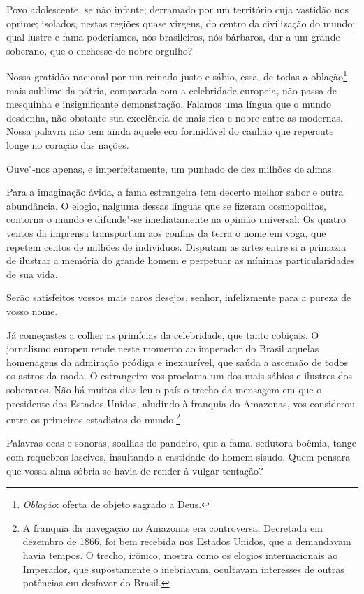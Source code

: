 Povo adolescente, se não infante; derramado por um território cuja
vastidão nos oprime; isolados, nestas regiões quase virgens, do centro
da civilização do mundo; qual lustre e fama poderíamos, nós
brasileiros, nós bárbaros, dar a um grande soberano, que o enchesse de
nobre orgulho? 

Nossa gratidão nacional por um reinado justo e sábio, essa, de todas a
oblação\footnote{ \textit{Oblação}: oferta de objeto sagrado a Deus.}
 mais sublime da pátria, comparada com a celebridade europeia, não passa
de mesquinha e insignificante demonstração. Falamos uma língua que o
mundo desdenha, não obstante sua excelência de mais rica e nobre entre
as modernas. Nossa palavra não tem ainda aquele eco formidável do
canhão que repercute longe no coração das nações.

Ouve"-nos apenas, e imperfeitamente, um punhado de dez milhões de almas.

Para a imaginação ávida, a fama estrangeira tem decerto melhor sabor e
outra abundância. O elogio, nalguma dessas línguas que se fizeram
cosmopolitas, contorna o mundo e difunde"-se imediatamente na opinião
universal. Os quatro ventos da imprensa transportam aos confins da
terra o nome em voga, que repetem centos de milhões de indivíduos.
Disputam as artes entre si a primazia de ilustrar a memória do grande
homem e perpetuar as mínimas particularidades de sua vida.

Serão satisfeitos vossos mais caros desejos, senhor, infelizmente para a
pureza de vosso nome.

Já começastes a colher as primícias da celebridade, que tanto cobiçais.
O jornalismo europeu rende neste momento ao imperador do Brasil aquelas
homenagens da admiração pródiga e inexaurível, que saúda a ascensão de
todos os astros da moda. O estrangeiro vos proclama um dos mais sábios
e ilustres dos soberanos. Não há muitos dias leu o país o trecho da
mensagem em que o presidente dos Estados Unidos, aludindo à franquia do
Amazonas, vos considerou entre os primeiros estadistas do
mundo.\footnote{ A franquia da navegação no Amazonas era controversa. 
Decretada em dezembro de 1866, foi bem recebida nos Estados Unidos, 
que a demandavam havia tempos. O trecho, irônico, mostra como os elogios 
internacionais ao Imperador, que supostamente o inebriavam, ocultavam 
interesses de outras potências em desfavor do \mbox{Brasil.}}

Palavras ocas e sonoras, soalhas do pandeiro, que a fama, sedutora
boêmia, tange com requebros lascivos, insultando a castidade do homem
sisudo. Quem pensara que vossa alma sóbria se havia de render à vulgar tentação? 

